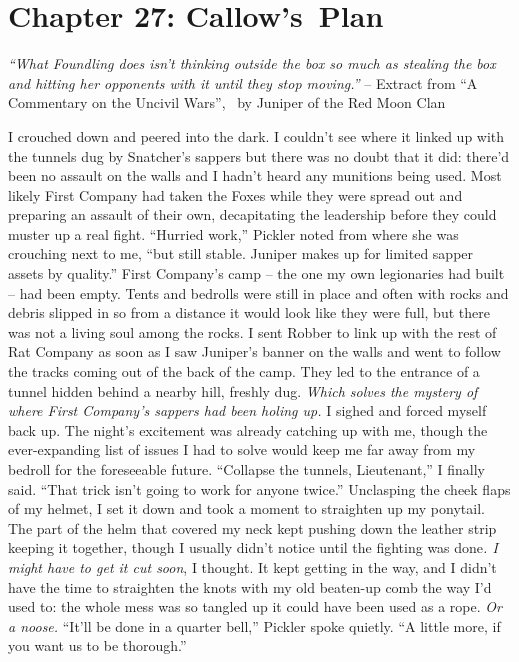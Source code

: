 \documentclass[12pt, openany]{book}
\begin{document}
\chapter{Chapter 27: Callow’s Plan}

\textit{“What Foundling does isn’t thinking outside the box so much as stealing the box and hitting her opponents with it until they stop moving.”}
– Extract from “A Commentary on the Uncivil Wars”,  by Juniper of the Red Moon Clan

I crouched down and peered into the dark.
I couldn’t see where it linked up with the tunnels dug by Snatcher’s sappers but there was no doubt that it did: there’d been no assault on the walls and I hadn’t heard any munitions being used. Most likely First Company had taken the Foxes while they were spread out and preparing an assault of their own, decapitating the leadership before they could muster up a real fight.
“Hurried work,” Pickler noted from where she was crouching next to me, “but still stable. Juniper makes up for limited sapper assets by quality.”
First Company’s camp – the one my own legionaries had built – had been empty. Tents and bedrolls were still in place and often with rocks and debris slipped in so from a distance it would look like they were full, but there was not a living soul among the rocks. I sent Robber to link up with the rest of Rat Company as soon as I saw Juniper’s banner on the walls and went to follow the tracks coming out of the back of the camp. They led to the entrance of a tunnel hidden behind a nearby hill, freshly dug. \textit{Which solves the mystery of where First Company’s sappers had been holing up.} I sighed and forced myself back up. The night’s excitement was already catching up with me, though the ever-expanding list of issues I had to solve would keep me far away from my bedroll for the foreseeable future.
“Collapse the tunnels, Lieutenant,” I finally said. “That trick isn’t going to work for anyone twice.”
Unclasping the cheek flaps of my helmet, I set it down and took a moment to straighten up my ponytail. The part of the helm that covered my neck kept pushing down the leather strip keeping it together, though I usually didn’t notice until the fighting was done\textit{. I might have to get it cut soon}, I thought. It kept getting in the way, and I didn’t have the time to straighten the knots with my old beaten-up comb the way I’d used to: the whole mess was so tangled up it could have been used as a rope. \textit{Or a noose.}
“It’ll be done in a quarter bell,” Pickler spoke quietly. “A little more, if you want us to be thorough.”
\end{document}
